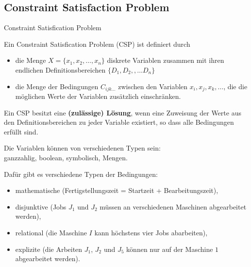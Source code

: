 \documentclass[hyperref={pdfpagelabels=false}]{beamer}
\begin{document}
\subsection{Constraint Satisfaction Problem}
\begin{frame}{Constraint Satisfication Problem}
  \begin{definition}
  Ein {\color{darkred} Constraint Satisfication Problem} ({\color{darkred}CSP}) ist definiert durch\begin{itemize}
	\item  die Menge $X= \{ x_1,x_2,\dots, x_n\}$ diskrete Variablen zusammen mit ihren endlichen Definitionsbereichen $\{ D_1,D_2,,\dots D_n\}$ 
	\item die Menge der Bedingungen $C_{ijk\dots}$ zwischen den Variablen $x_i, x_j, x_k, \dots$, die die möglichen Werte der Variablen zusätzlich einschränken.
  \end{itemize}
  Ein CSP besitzt eine {\bf (zulässige) Lösung}, wenn eine Zuweisung der Werte aus den  Definitionsbereichen zu jeder Variable existiert, so dass alle Bedingungen erfüllt sind.
  \end{definition}
\end{frame}
\begin{frame}
Die Variablen können von verschiedenen Typen sein:\\ ganzzahlig, boolean, symbolisch, Mengen.
\vspace{15pt}

Dafür gibt es verschiedene Typen der Bedingungen:
\begin{itemize}
	\setlength{\itemsep}{0pt}
	\item mathematische (Fertigstellungszeit = Startzeit + Bearbeitungszeit),
	\item disjunktive (Jobs $J_1$ und $J_2$ müssen an verschiedenen Maschinen abgearbeitet werden),
	\item relational (die Maschine $I$ kann höchstens vier Jobs abarbeiten),
	\item explizite (die Arbeiten $J_1$, $J_2$ und $J_5$ können nur auf der Maschine $1$ abgearbeitet werden).
\end{itemize}
\end{frame}
\end{document}
